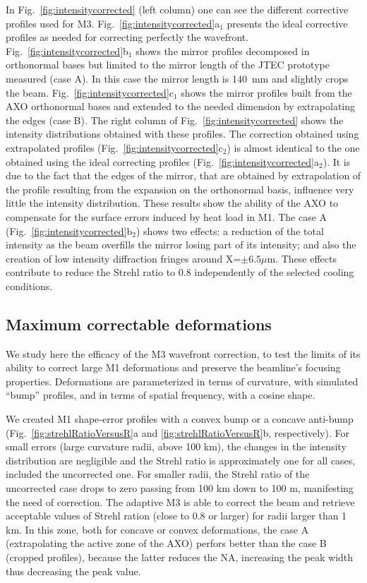 \documentclass{iucr}
\newcommand{\inblue}[1]{{\color{black}#1}}
\begin{document}
In Fig.~\ref{fig:intensitycorrected} (left column) one can see the different corrective profiles used for M3. 
Fig.~\ref{fig:intensitycorrected}a$_1$ presents the ideal corrective profiles as needed for correcting perfectly the wavefront.
\inblue{
Fig.~\ref{fig:intensitycorrected}b$_1$ shows the mirror profiles decomposed in orthonormal bases but limited to the mirror length of the JTEC prototype measured (case A). In this case the mirror length is 140~mm and slightly crops the beam.
Fig.~\ref{fig:intensitycorrected}c$_1$ shows the mirror profiles built from the AXO orthonormal bases and extended to the needed dimension by extrapolating the edges (case B).
}
The right column of Fig.~\ref{fig:intensitycorrected} shows the intensity distributions obtained with these profiles.
The correction obtained using extrapolated profiles (Fig.~\ref{fig:intensitycorrected}c$_2$) is almost identical to the one obtained using the ideal correcting profiles (Fig.~\ref{fig:intensitycorrected}a$_2$). It is due to the fact that the edges of the mirror, that are obtained by extrapolation of the profile resulting from the expansion on the orthonormal basis, influence very little the intensity distribution.
These results show the ability of the AXO to compensate for the surface errors induced by heat load in M1. The case A (Fig.~\ref{fig:intensitycorrected}b$_2$) shows two effects: a reduction of the total intensity as the beam overfills the mirror losing part of its intensity; and also the creation of low intensity diffraction fringes around X=$\pm6.5\mu$m. These effects contribute to reduce the Strehl ratio to 0.8 independently of the selected cooling conditions.


\subsection{Maximum correctable deformations}
\label{sec:scans}

We study here the efficacy of the M3 wavefront correction, to test the limits of its ability to correct large M1 deformations and preserve the beamline's focusing properties. Deformations are parameterized in terms of curvature, with simulated ``bump'' profiles, and in terms of spatial frequency, with a cosine shape.

We created M1 shape-error profiles with a convex bump or a concave anti-bump (Fig.~\ref{fig:strehlRatioVersusR}a and \ref{fig:strehlRatioVersusR}b, respectively). For small errors (large curvature radii, above 100 km), the changes in the intensity distribution are negligible and the Strehl ratio is approximately one for all cases, included the uncorrected one. For smaller radii, the Strehl ratio of the uncorrected case drops to zero passing from 100 km down to 100 m, manifesting the need of correction. The adaptive M3 is able to correct the beam and retrieve acceptable values of Strehl ration (close to 0.8 or larger) for radii larger than 1 km. In this zone, both for concave or convex deformations, the case A (extrapolating the active zone of the AXO) perfors better than the case B (cropped profiles), because the latter reduces the NA, increasing the peak width thus decreasing the peak value.
\end{document}
